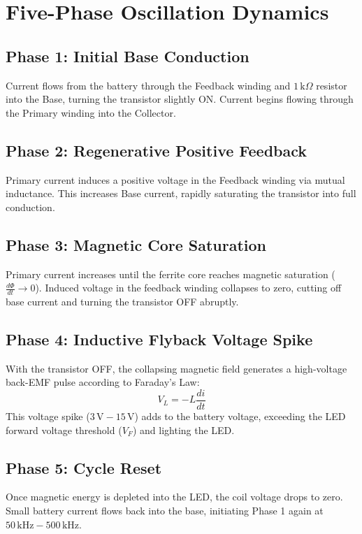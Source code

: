\documentclass[11pt,a4paper]{article}
\begin{document}
\section{Five-Phase Oscillation Dynamics}

\subsection{Phase 1: Initial Base Conduction}
Current flows from the battery through the Feedback winding and $1\,\text{k}\Omega$ resistor into the Base, turning the transistor slightly ON. Current begins flowing through the Primary winding into the Collector.

\subsection{Phase 2: Regenerative Positive Feedback}
Primary current induces a positive voltage in the Feedback winding via mutual inductance. This increases Base current, rapidly saturating the transistor into full conduction.

\subsection{Phase 3: Magnetic Core Saturation}
Primary current increases until the ferrite core reaches magnetic saturation ($\frac{d\Phi}{dt} \rightarrow 0$). Induced voltage in the feedback winding collapses to zero, cutting off base current and turning the transistor OFF abruptly.

\subsection{Phase 4: Inductive Flyback Voltage Spike}
With the transistor OFF, the collapsing magnetic field generates a high-voltage back-EMF pulse according to Faraday's Law:
\begin{equation}
V_L = -L \frac{di}{dt}
\end{equation}
This voltage spike ($3\,\text{V} - 15\,\text{V}$) adds to the battery voltage, exceeding the LED forward voltage threshold ($V_F$) and lighting the LED.

\subsection{Phase 5: Cycle Reset}
Once magnetic energy is depleted into the LED, the coil voltage drops to zero. Small battery current flows back into the base, initiating Phase 1 again at $50\,\text{kHz} - 500\,\text{kHz}$.
\end{document}
